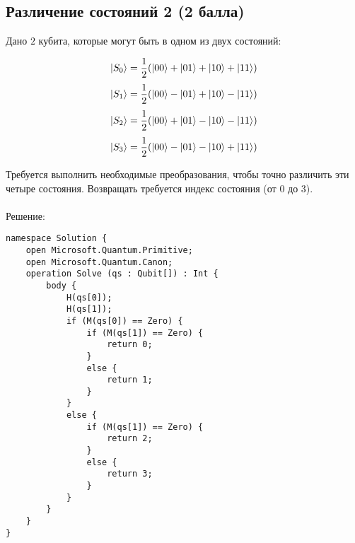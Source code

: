 \documentclass{article}
\begin{document}
\subsection{Различение состояний 2 (2 балла)}

Дано $2$ кубита, которые могут быть в одном из двух состояний:

$$\Ket{S_0} = \frac{1}{2}(\Ket{00} + \Ket{01} + \Ket{10} + \Ket{11})$$
$$\Ket{S_1} = \frac{1}{2}(\Ket{00} - \Ket{01} + \Ket{10} - \Ket{11})$$
$$\Ket{S_2} = \frac{1}{2}(\Ket{00} + \Ket{01} - \Ket{10} - \Ket{11})$$
$$\Ket{S_3} = \frac{1}{2}(\Ket{00} - \Ket{01} - \Ket{10} + \Ket{11})$$


Требуется выполнить необходимые преобразования, чтобы точно различить эти четыре состояния. Возвращать требуется индекс состояния (от $0$ до $3$). 
\\\\
Решение:
\begin{lstlisting}
namespace Solution {
    open Microsoft.Quantum.Primitive;
    open Microsoft.Quantum.Canon;
    operation Solve (qs : Qubit[]) : Int {
        body {
            H(qs[0]);
            H(qs[1]);
            if (M(qs[0]) == Zero) {
                if (M(qs[1]) == Zero) {
                    return 0;
                }
                else {
                    return 1;
                }
            }
            else {
                if (M(qs[1]) == Zero) {
                    return 2;
                }
                else {
                    return 3;
                }
            }
        }
    }
}
\end{lstlisting}
\end{document}
